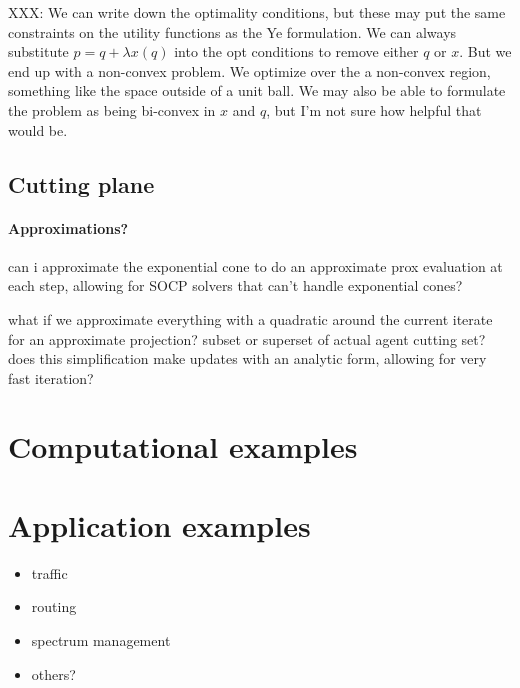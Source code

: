 \documentclass{article}
\begin{document}
XXX: We can write down the optimality conditions, but these may put the same
constraints on the utility functions as the Ye formulation. We can always
substitute $p = q + \lambda x(q)$ into the opt conditions to remove either
$q$ or $x$. But we end up with a non-convex problem. We optimize over the a
non-convex region, something like the space outside of a unit ball.
We may also be able to formulate the problem as being bi-convex in $x$ and $q$,
but I'm not sure how helpful that would be.

\subsection{Cutting plane}
\paragraph{Approximations?}
can i approximate the exponential cone to do an approximate prox evaluation
at each step, allowing for SOCP solvers that can't handle exponential cones?

what if we approximate everything with a quadratic around the current iterate for an approximate projection? subset or superset of actual agent cutting set? does this simplification make updates with an analytic form, allowing for very fast iteration?


\section{Computational examples}

\section{Application examples}
\begin{itemize}
\item traffic
\item routing
\item spectrum management
\item others?
\end{itemize}

\newpage


\end{document}
